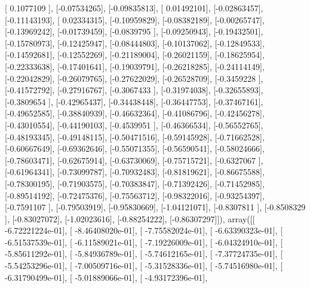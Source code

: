 \documentclass{article}
\begin{document}
       [ 0.1077109 ],
       [-0.07534265],
       [-0.09835813],
       [ 0.01492101],
       [-0.02863457],
       [-0.11143193],
       [ 0.02334315],
       [-0.10959829],
       [-0.08382189],
       [-0.00265747],
       [-0.13969242],
       [-0.01739459],
       [-0.0839795 ],
       [-0.09250943],
       [-0.19432501],
       [-0.15780973],
       [-0.12425947],
       [-0.08444803],
       [-0.10137062],
       [-0.12849533],
       [-0.14592681],
       [-0.12552269],
       [-0.21189004],
       [-0.26021159],
       [-0.18625954],
       [-0.22333638],
       [-0.17401641],
       [-0.19039791],
       [-0.26218285],
       [-0.24114149],
       [-0.22042829],
       [-0.26079765],
       [-0.27622029],
       [-0.26528709],
       [-0.3459228 ],
       [-0.41572792],
       [-0.27916767],
       [-0.3067433 ],
       [-0.31974038],
       [-0.32655893],
       [-0.3809654 ],
       [-0.42965437],
       [-0.34438448],
       [-0.36447753],
       [-0.37467161],
       [-0.49652585],
       [-0.38840939],
       [-0.46632364],
       [-0.41086796],
       [-0.42456278],
       [-0.43010554],
       [-0.44190103],
       [-0.4539951 ],
       [-0.46366534],
       [-0.56552765],
       [-0.48193345],
       [-0.49148115],
       [-0.50471516],
       [-0.59145928],
       [-0.71662528],
       [-0.60667649],
       [-0.69362646],
       [-0.55071355],
       [-0.56590541],
       [-0.58024666],
       [-0.78603471],
       [-0.62675914],
       [-0.63730069],
       [-0.75715721],
       [-0.6327067 ],
       [-0.61964341],
       [-0.73099787],
       [-0.70932483],
       [-0.81819621],
       [-0.86675588],
       [-0.78300195],
       [-0.71903575],
       [-0.70383847],
       [-0.71392426],
       [-0.71452985],
       [-0.89514192],
       [-0.72475376],
       [-0.75563712],
       [-0.98322016],
       [-0.93254397],
       [-0.7591107 ],
       [-0.79503919],
       [-0.95830669],
       [-1.04121071],
       [-0.8307811 ],
       [-0.8508329 ],
       [-0.83027072],
       [-1.02023616],
       [-0.88254222],
       [-0.86307297]]), array([[ -6.72221224e-01],
       [ -8.46408020e-01],
       [ -7.75582024e-01],
       [ -6.63390323e-01],
       [ -6.51537539e-01],
       [ -6.11589021e-01],
       [ -7.19226009e-01],
       [ -6.04324910e-01],
       [ -5.85611292e-01],
       [ -5.84936789e-01],
       [ -5.74612165e-01],
       [ -7.37724735e-01],
       [ -5.54253296e-01],
       [ -7.00509716e-01],
       [ -5.31528336e-01],
       [ -5.74516980e-01],
       [ -6.31790499e-01],
       [ -5.01889066e-01],
       [ -4.93172396e-01],
\end{document}
